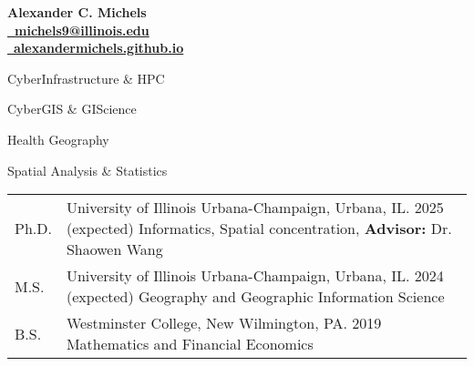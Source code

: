 \documentclass{acmcv}
\begin{document}
	\begin{multicols}{2}
		\vspace*{.15cm}
		\textbf{\LARGE Alexander C. Michels} \\
		\columnbreak
		\hfill\href{mailto:michels9@illinois.edu}{\textbf{\faEnvelope~michels9@illinois.edu}} \\
		\hfill\href{http://alexandermichels.github.io}{\faGlobeAmericas~\textbf{alexandermichels.github.io}} \\
	\end{multicols}

	
	\begin{multicols}{2}
		\begin{titemize}
			\item CyberInfrastructure \& HPC
			\item CyberGIS \& GIScience
			\item Health Geography
			\item Spatial Analysis \& Statistics
		\end{titemize}
	\end{multicols}


    \begin{longtable}{p{0.1\linewidth} p{0.9\linewidth}}
        Ph.D. & University of Illinois Urbana-Champaign, Urbana, IL. 2025 (expected) \newline Informatics, Spatial concentration, \textbf{Advisor:} Dr. Shaowen Wang \\

        M.S. & University of Illinois Urbana-Champaign, Urbana, IL. 2024 (expected) \newline Geography and Geographic Information Science\\

        B.S. & Westminster College, New Wilmington, PA. 2019 \newline Mathematics and Financial Economics\\
    \end{longtable}
    \vspace*{-0.5cm}
\end{document}
